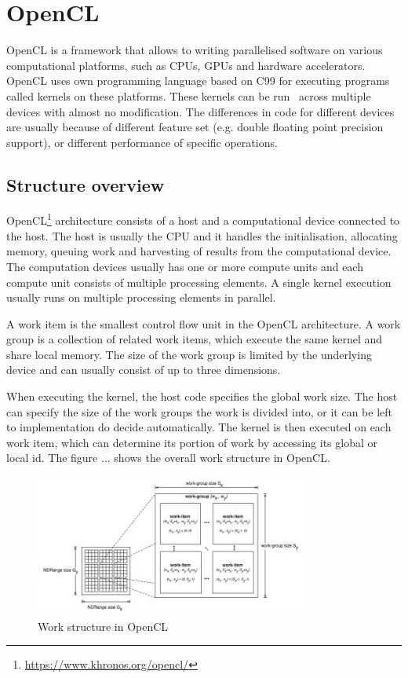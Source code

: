 \documentclass{l4proj}
\begin{document}
\section{OpenCL}

OpenCL is a framework that allows to writing parallelised software on various computational
platforms, such as CPUs, GPUs and hardware accelerators. OpenCL uses own programming language
based on C99 for executing programs called kernels on these platforms. These kernels can be run \
across multiple devices with almost no modification. The differences in code for different devices are 
usually because of different feature set (e.g. double floating point precision support), or
different performance of specific operations.

\subsection{Structure overview}

OpenCL\footnote{\url{https://www.khronos.org/opencl/}} architecture consists 
of a host and a computational device connected to the host.
The host is usually the CPU and it handles the initialisation, allocating memory, queuing work
and harvesting of results from the computational device. The computation devices usually has one
or more compute units and each compute unit consists of multiple processing elements. A single kernel
execution usually runs on multiple processing elements in parallel.

A work item is the smallest control flow unit in the OpenCL architecture. A work group is a 
collection of related work items, which execute the same kernel and share local memory.
The size of the work group is limited by the underlying device and can usually consist of up to 
three dimensions.

When executing the kernel, the host code specifies the global work size. The host can specify 
the size of the work groups the work is divided into, or it can be left to implementation do decide
automatically. The kernel is then executed on each work item, which can determine its portion 
of work by accessing its global or local id. The figure ... shows the overall work structure in OpenCL.

\begin{figure}
\centering
\includegraphics[width=0.8\textwidth]{images/opencl.jpg}
\caption{Work structure in OpenCL \protect\footnotemark}
\label{fig:opencl}
\end{figure}
\end{document}
